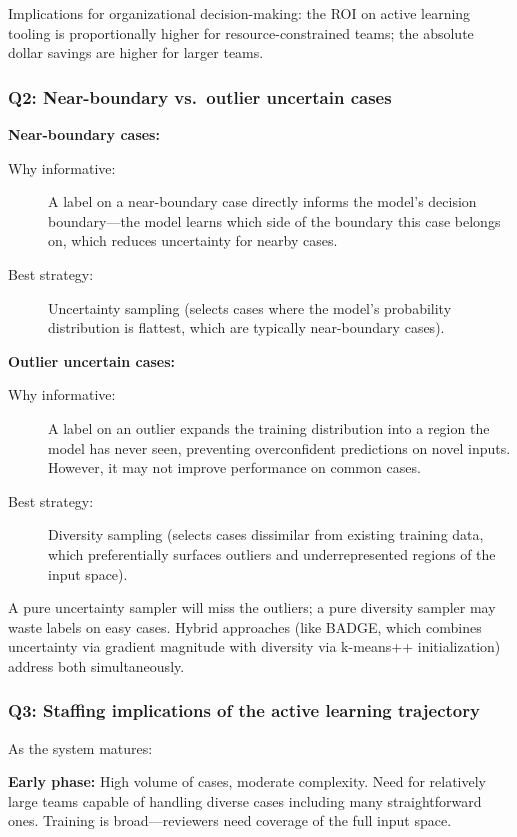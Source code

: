 Implications for organizational decision-making: the ROI on active learning tooling is proportionally higher for resource-constrained teams; the absolute dollar savings are higher for larger teams.

\subsubsection*{Q2: Near-boundary vs.\ outlier uncertain cases}

\textbf{Near-boundary cases:}
\begin{description}
    \item[Why informative:] A label on a near-boundary case directly informs the model's decision boundary---the model learns which side of the boundary this case belongs on, which reduces uncertainty for nearby cases.
    \item[Best strategy:] Uncertainty sampling (selects cases where the model's probability distribution is flattest, which are typically near-boundary cases).
\end{description}

\textbf{Outlier uncertain cases:}
\begin{description}
    \item[Why informative:] A label on an outlier expands the training distribution into a region the model has never seen, preventing overconfident predictions on novel inputs. However, it may not improve performance on common cases.
    \item[Best strategy:] Diversity sampling (selects cases dissimilar from existing training data, which preferentially surfaces outliers and underrepresented regions of the input space).
\end{description}

A pure uncertainty sampler will miss the outliers; a pure diversity sampler may waste labels on easy cases. Hybrid approaches (like BADGE, which combines uncertainty via gradient magnitude with diversity via k-means++ initialization) address both simultaneously.

\subsubsection*{Q3: Staffing implications of the active learning trajectory}

As the system matures:

\textbf{Early phase:} High volume of cases, moderate complexity. Need for relatively large teams capable of handling diverse cases including many straightforward ones. Training is broad---reviewers need coverage of the full input space.

